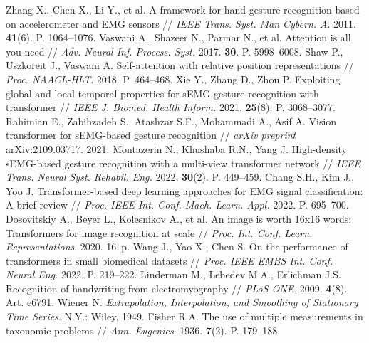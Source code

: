 \documentclass[12pt,a4paper]{article}
\begin{document}
\begin{thebibliography}{99}
 Zhang X., Chen X., Li Y., et al. A framework for hand gesture recognition based on accelerometer and EMG sensors // \textit{IEEE Trans. Syst. Man Cybern. A}. 2011. \textbf{41}(6). P. 1064–1076.
 Vaswani A., Shazeer N., Parmar N., et al. Attention is all you need // \textit{Adv. Neural Inf. Process. Syst.} 2017. \textbf{30}. P. 5998–6008.
 Shaw P., Uszkoreit J., Vaswani A. Self-attention with relative position representations // \textit{Proc. NAACL-HLT}. 2018. P. 464–468.
 Xie Y., Zhang D., Zhou P. Exploiting global and local temporal properties for sEMG gesture recognition with transformer // \textit{IEEE J. Biomed. Health Inform.} 2021. \textbf{25}(8). P. 3068–3077.
 Rahimian E., Zabihzadeh S., Atashzar S.F., Mohammadi A., Asif A. Vision transformer for sEMG-based gesture recognition // \textit{arXiv preprint} arXiv:2109.03717. 2021.
 Montazerin N., Khushaba R.N., Yang J. High-density sEMG-based gesture recognition with a multi-view transformer network // \textit{IEEE Trans. Neural Syst. Rehabil. Eng.} 2022. \textbf{30}(2). P. 449–459.
 Chang S.H., Kim J., Yoo J. Transformer-based deep learning approaches for EMG signal classification: A brief review // \textit{Proc. IEEE Int. Conf. Mach. Learn. Appl.} 2022. P. 695–700.
 Dosovitskiy A., Beyer L., Kolesnikov A., et al. An image is worth 16x16 words: Transformers for image recognition at scale // \textit{Proc. Int. Conf. Learn. Representations}. 2020. 16~p.
 Wang J., Yao X., Chen S. On the performance of transformers in small biomedical datasets // \textit{Proc. IEEE EMBS Int. Conf. Neural Eng.} 2022. P. 219–222.
 Linderman M., Lebedev M.A., Erlichman J.S. Recognition of handwriting from electromyography // \textit{PLoS ONE}. 2009. \textbf{4}(8). Art. e6791.
 Wiener N. \textit{Extrapolation, Interpolation, and Smoothing of Stationary Time Series}. N.Y.: Wiley, 1949.
 Fisher R.A. The use of multiple measurements in taxonomic problems // \textit{Ann. Eugenics}. 1936. \textbf{7}(2). P. 179–188.
\end{thebibliography}
\end{document}
